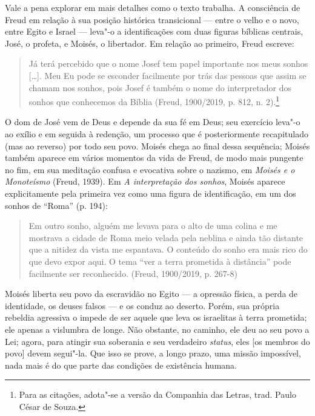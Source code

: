 Vale a pena explorar em mais detalhes como o texto trabalha. A
consciência de Freud em relação à sua posição histórica transicional ---
entre o velho e o novo, entre Egito e Israel --- leva"-o a identificações
com duas figuras bíblicas centrais, José, o profeta, e Moisés, o
libertador. Em relação ao primeiro, Freud escreve:

\begin{quote}
Já terá percebido que o nome Josef tem papel importante nos meus sonhos
{[}\ldots{}{]}. Meu Eu pode se esconder facilmente por trás das pessoas que
assim se chamam nos sonhos, pois Josef é também o nome do interpretador
dos sonhos que conhecemos da Bíblia (Freud, 1900/2019, p. 812, n.
2).\footnote{Para as citações, adota"-se a versão da Companhia das Letras,
  trad. Paulo César de Souza.}
\end{quote}

O dom de José vem de Deus e depende da sua fé em Deus; seu exercício
leva"-o ao exílio e em seguida à redenção, um processo que é
posteriormente recapitulado (mas ao reverso) por todo seu povo. Moisés
chega ao final dessa sequência; Moisés também aparece em vários momentos
da vida de Freud, de modo mais pungente no fim, em sua meditação confusa
e evocativa sobre o nazismo, em \emph{Moisés e o Monoteísmo} (Freud,
1939). Em \emph{A interpretação dos sonhos}, Moisés aparece
explicitamente pela primeira vez como uma figura de identificação, em um
dos sonhos de ``Roma'' (p. 194):

\begin{quote}
Em outro sonho, alguém me levava para o alto de uma colina e me mostrava
a cidade de Roma meio velada pela neblina e ainda tão distante que a
nitidez da vista me espantava. O conteúdo do sonho era mais rico do que
devo expor aqui. O tema ``ver a terra prometida à distância'' pode
facilmente ser reconhecido. (Freud, 1900/2019, p. 267-8)
\end{quote}

Moisés liberta seu povo da escravidão no Egito --- a opressão física, a
perda de identidade, os deuses falsos --- e os conduz ao deserto. Porém,
sua própria rebeldia agressiva o impede de ser aquele que leva os
israelitas à terra prometida; ele apenas a vislumbra de longe. Não
obstante, no caminho, ele deu ao seu povo a Lei; agora, para atingir sua
soberania e seu verdadeiro \emph{status}, eles {[}os membros do povo{]}
devem segui"-la. Que isso se prove, a longo prazo, uma missão impossível,
nada mais é do que parte das condições de existência humana.

